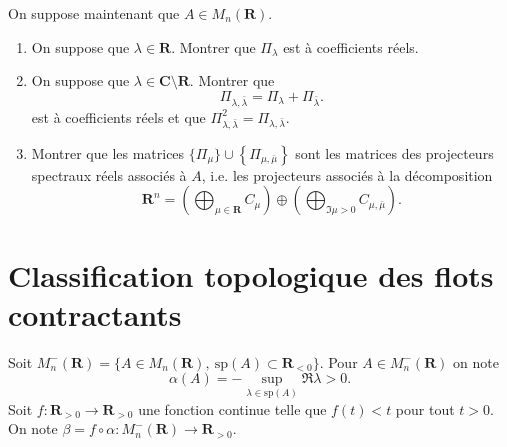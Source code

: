 \documentclass[a4paper,12pt]{article}
\theoremstyle{plain}
\theoremstyle{definition}
\newcommand{\R}{\mathbf{R}}
\newcommand{\C}{\mathbf{C}}
\renewcommand{\sp}{\mathrm{sp}}
\begin{document}
\noindent On suppose maintenant que $A \in M_n(\R)$.
\begin{enumerate}[resume, label=\textbf{\arabic*.}]
\item On suppose que $\lambda \in \R$. Montrer que $\Pi_\lambda$ est \`a coefficients r\'eels.
\item On suppose que $\lambda \in \C \setminus \R$. Montrer que
$$
\Pi_{\lambda, \bar{\lambda}} = \Pi_\lambda + \Pi_{\bar\lambda}.
$$
est \`a coefficients r\'eels et que $\Pi_{\lambda,\bar\lambda}^2 = \Pi_{\lambda, \bar \lambda}$.

\item Montrer que les matrices $\{\Pi_\mu\} \cup \left\{\Pi_{\mu, \bar\mu}\right\}$ sont les matrices des projecteurs spectraux r\'eels associ\'es \`a $A$, i.e. les projecteurs associ\'es \`a la d\'ecomposition
$$
\R^n = \left(\bigoplus_{\mu \in \R} C_\mu\right) \oplus \left(\bigoplus_{\Im \mu > 0} C_{\mu, \bar\mu}\right).
$$



\end{enumerate}

\section*{Classification topologique des flots contractants}

Soit $M_n^{-}(\R) = \{A \in M_n(\R),~\sp(A) \subset \R_{<0}\}$. Pour $A \in M_n^{-}(\R)$ on note
$$
\alpha(A)= - \sup_{\lambda \in \sp(A)} \Re{\lambda} > 0.
$$
Soit $f : \R_{>0} \to \R_{>0}$ une fonction continue telle que $f(t) < t$ pour tout $t > 0$. On note $\beta = f \circ \alpha : M_n^{-}(\R) \to \R_{>0}$.
\end{document}
